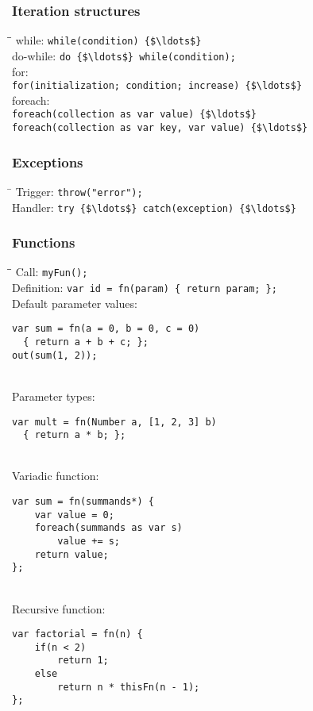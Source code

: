 \documentclass[paper=A4,paper=landscape,pagesize,9pt,DIV=30]{scrartcl}
\begin{document}
\begin{multicols}{3}
\subsubsection*{Iteration structures}
\begin{tabbing}
\hspace{0.25cm}\=\hspace{1.5cm}\= \kill
while:			\>\>\lstinline!while(condition) {$\ldots$}! \\
do-while:		\>\>\lstinline!do {$\ldots$} while(condition);! \\
for: \\
\>\lstinline!for(initialization; condition; increase) {$\ldots$}! \\
foreach: \\
\>\lstinline!foreach(collection as var value) {$\ldots$}! \\
\>\lstinline!foreach(collection as var key, var value) {$\ldots$}!
\end{tabbing}
\subsubsection*{Exceptions}
\begin{tabbing}
\hspace{1.75cm}\=\kill
Trigger: 		\>\lstinline!throw("error");! \\
Handler: 		\>\lstinline!try {$\ldots$} catch(exception) {$\ldots$}!
\end{tabbing}
\subsubsection*{Functions}
\begin{tabbing}
\hspace{0.25cm}\=\hspace{1.5cm}\= \kill
Call: 			\>\>\lstinline!myFun();! \\
Definition:		\>\>\lstinline!var id = fn(param) { return param; };! \\
Default parameter values: \\
\>\begin{lstlisting}
var sum = fn(a = 0, b = 0, c = 0)
  { return a + b + c; };
out(sum(1, 2));
\end{lstlisting} \\
Parameter types: \\
\>\begin{lstlisting}
var mult = fn(Number a, [1, 2, 3] b)
  { return a * b; };
\end{lstlisting} \\
Variadic function: \\
\>\begin{lstlisting}
var sum = fn(summands*) {
	var value = 0;
	foreach(summands as var s)
		value += s;
	return value;
};
\end{lstlisting} \\
Recursive function: \\
\>\begin{lstlisting}
var factorial = fn(n) {
	if(n < 2)
		return 1;
	else
		return n * thisFn(n - 1);
};
\end{lstlisting}
\end{tabbing}

\end{multicols}
\end{document}
